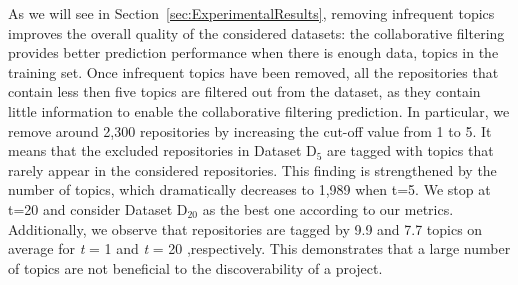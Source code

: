 As we will see in Section~\ref{sec:ExperimentalResults}, removing infrequent topics improves the overall quality of the considered datasets: %
the collaborative filtering provides better prediction performance when there is enough data, \ie topics in the training set. %
Once infrequent topics have been removed, all the repositories that contain less then five topics are filtered out from the dataset, as they contain little information to enable the collaborative filtering prediction. In particular, we remove around 2,300 repositories by increasing the cut-off value from 1 to 5. It means that the excluded repositories in Dataset D$_5$ are tagged with topics that rarely appear in the considered repositories. This finding is strengthened by the number of topics, which dramatically decreases to 1,989 when t=5. %
We stop at t=20 and consider Dataset D$_{20}$ as the best one according to our metrics. Additionally, we observe that repositories are tagged by 9.9 and 7.7 topics on average for \emph{t} = 1 and \emph{t} = 20 ,respectively. This demonstrates that a large number of topics are not beneficial to the discoverability of a project.

